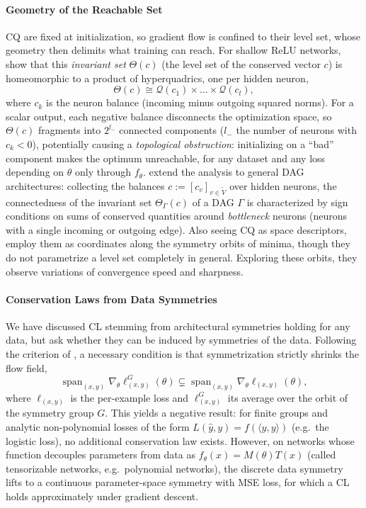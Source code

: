 \documentclass[mathematics,review,submit,moreauthors]{Definitions/mdpi}
\begin{document}
\paragraph{Geometry of the Reachable Set}
CQ are fixed at initialization, so gradient flow is confined to their level set, whose geometry then delimits what training can reach.
For shallow ReLU networks, \citet{nurisso2024a} show that this \emph{invariant set} $\Theta(c)$ (the level set of the conserved vector $c$) is homeomorphic to a product of hyperquadrics, one per hidden neuron,
\begin{equation*}
    \Theta(c)\cong\mathcal{Q}(c_1)\times\dots\times\mathcal{Q}(c_l),
\end{equation*}
where $c_k$ is the neuron balance (incoming minus outgoing squared norms).
For a scalar output, each negative balance disconnects the optimization space, so $\Theta(c)$ fragments into $2^{l_-}$ connected components ($l_-$ the number of neurons with $c_k<0$), potentially causing a \emph{topological obstruction}: initializing on a ``bad'' component makes the optimum unreachable, for any dataset and any loss depending on $\theta$ only through $f_\theta$.
\citet{nurisso2025} extend the analysis to general DAG architectures: collecting the balances $c:=[c_v]_{v\in\tilde{V}}$ over hidden neurons, the connectedness of the invariant set $\Theta_\Gamma(c)$ of a DAG $\Gamma$ is characterized by sign conditions on sums of conserved quantities around \emph{bottleneck} neurons (neurons with a single incoming or outgoing edge).
Also seeing CQ as space descriptors, \citet{zhao2023a} employ them as coordinates along the symmetry orbits of minima, though they do not parametrize a level set completely in general.
Exploring these orbits, they observe variations of convergence speed and sharpness.

\paragraph{Conservation Laws from Data Symmetries}
We have discussed CL stemming from architectural symmetries holding for any data, but \citet{galley2026} ask whether they can be induced by symmetries of the data.
Following the criterion of \citet{marcotte2023}, a necessary condition is that symmetrization strictly shrinks the flow field,
\begin{equation*}
    \operatorname{span}_{(x,y)}\nabla_\theta\ell^G_{(x,y)}(\theta)\subsetneq\operatorname{span}_{(x,y)}\nabla_\theta\ell_{(x,y)}(\theta),
\end{equation*}
where $\ell_{(x,y)}$ is the per-example loss and $\ell^G_{(x,y)}$ its average over the orbit of the symmetry group $G$.
This yields a negative result: for finite groups and analytic non-polynomial losses of the form $L(\hat y,y)=f(\langle\hat y,y\rangle)$ (e.g.\ the logistic loss), no additional conservation law exists.
However, on networks whose function decouples parameters from data as $f_\theta(x)=M(\theta)T(x)$ (called tensorizable networks, e.g.\ polynomial networks), the discrete data symmetry lifts to a continuous parameter-space symmetry with MSE loss, for which a CL holds approximately under gradient descent.
\end{document}
